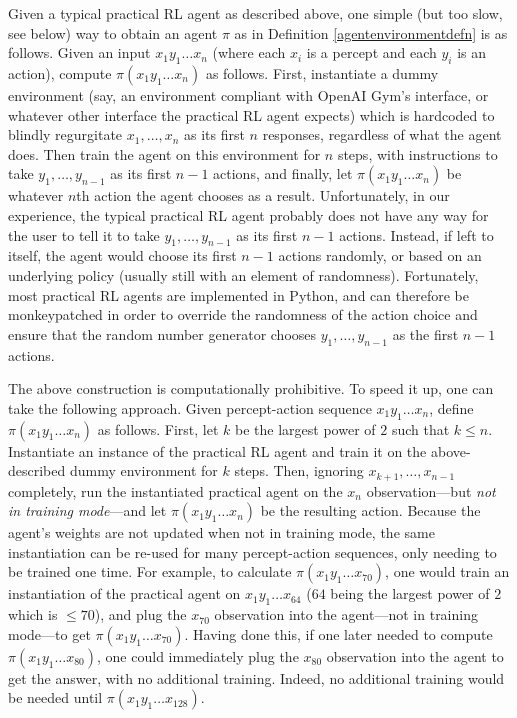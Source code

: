 \documentclass{article}
\begin{document}
Given a typical practical RL agent as described above, one simple
(but too slow, see below)
way to obtain an agent
$\pi$ as in Definition \ref{agentenvironmentdefn} is as follows.
Given an input $x_1y_1\ldots x_n$ (where each $x_i$ is a percept and each $y_i$ is an
action), compute $\pi(x_1y_1\ldots x_n)$ as follows. First, instantiate a dummy
environment (say, an environment compliant with OpenAI Gym's interface, or whatever other
interface the practical RL agent expects) which is hardcoded to blindly regurgitate
$x_1,\ldots,x_n$ as its first $n$ responses, regardless of what the agent does.
Then train the agent on this environment for $n$ steps, with instructions to
take $y_1,\ldots,y_{n-1}$ as its first $n-1$ actions, and finally, let
$\pi(x_1y_1\ldots x_n)$ be whatever $n$th action the agent chooses as a result.
Unfortunately, in our experience, the typical practical RL agent probably does not have
any way for the user to tell it to take $y_1,\ldots,y_{n-1}$ as its first $n-1$
actions. Instead, if left to itself, the agent would choose its first $n-1$ actions
randomly, or based on an underlying policy (usually still with an element of randomness).
Fortunately, most practical RL agents are implemented in Python, and can therefore
be monkeypatched in order to override the randomness of the action choice and ensure
that the random number generator chooses $y_1,\ldots,y_{n-1}$ as the first $n-1$
actions.

The above construction is computationally prohibitive.
To speed it up, one can take the following approach.
Given percept-action sequence $x_1y_1\ldots x_n$,
define $\pi(x_1y_1\ldots x_n)$ as follows.
First, let $k$ be the largest power of $2$ such that $k\leq n$.
Instantiate an instance of the practical RL agent and train it on the
above-described dummy environment for $k$ steps.
Then, ignoring $x_{k+1},\ldots,x_{n-1}$ completely,
run the instantiated practical agent on the $x_n$ observation---but
\emph{not in training mode}---and let
$\pi(x_1y_1\ldots x_n)$ be the resulting action.
Because the agent's weights are not updated when not in training mode,
the same instantiation can be re-used for many percept-action sequences,
only needing to be trained one time.
For example, to calculate $\pi(x_1y_1\ldots x_{70})$,
one would train an instantiation of the practical agent on
$x_1y_1\ldots x_{64}$ ($64$ being the largest power of $2$ which is $\leq 70$),
and plug the $x_{70}$ observation into the agent---not in training mode---to get
$\pi(x_1y_1\ldots x_{70})$.
Having done this, if one later needed to compute
$\pi(x_1y_1\ldots x_{80})$, one could immediately plug the $x_{80}$ observation into
the agent to get the answer, with no additional training. Indeed, no additional
training would be needed until $\pi(x_1y_1\ldots x_{128})$.
\end{document}
